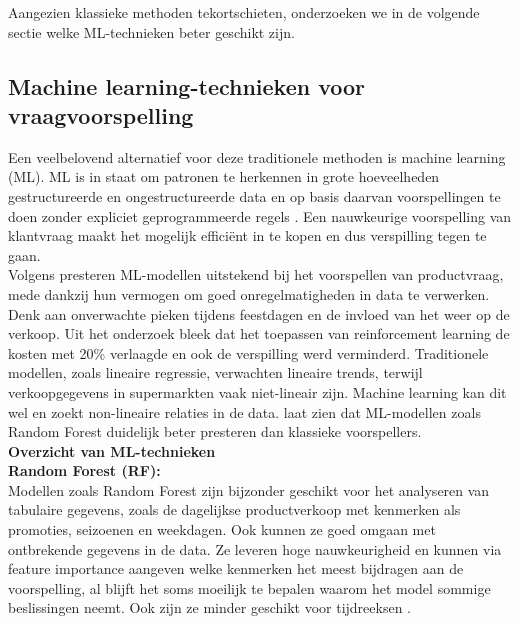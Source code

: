 \documentclass{hogent-article}
\begin{document}
    Aangezien klassieke methoden tekortschieten, onderzoeken we in de volgende sectie welke ML-technieken beter geschikt zijn.
    
    \subsection{Machine learning-technieken voor vraagvoorspelling}
    
    Een veelbelovend alternatief voor deze traditionele methoden is machine learning (ML). ML is in staat om patronen te herkennen in grote hoeveelheden gestructureerde en ongestructureerde data en op basis daarvan voorspellingen te doen zonder expliciet geprogrammeerde regels \autocite{Chopra2016}. Een nauwkeurige voorspelling van klantvraag maakt het mogelijk efficiënt in te kopen en dus verspilling tegen te gaan.\\
    
    Volgens \textcite{Pilarski2024} presteren ML-modellen uitstekend bij het voorspellen van productvraag, mede dankzij hun vermogen om goed onregelmatigheden in data te verwerken. Denk aan onverwachte pieken tijdens feestdagen en de invloed van het weer op de verkoop. Uit het onderzoek bleek dat het toepassen van reinforcement learning de kosten met 20\% verlaagde en ook de verspilling werd verminderd. Traditionele modellen, zoals lineaire regressie, verwachten lineaire trends, terwijl verkoopgegevens in supermarkten vaak niet-lineair zijn. Machine learning kan dit wel en zoekt non-lineaire relaties in de data. \textcite{Liu2021} laat zien dat ML-modellen zoals Random Forest duidelijk beter presteren dan klassieke voorspellers. \\
    
    \textbf{Overzicht van ML-technieken}\\
    
    \textbf{Random Forest (RF):}\\
    
    Modellen zoals Random Forest zijn bijzonder geschikt voor het analyseren van tabulaire gegevens, zoals de dagelijkse productverkoop met kenmerken als promoties, seizoenen en weekdagen. Ook kunnen ze goed omgaan met ontbrekende gegevens in de data. Ze leveren hoge nauwkeurigheid en kunnen via feature importance aangeven welke kenmerken het meest bijdragen aan de voorspelling, al blijft het soms moeilijk te bepalen waarom het model sommige beslissingen neemt. Ook zijn ze minder geschikt voor tijdreeksen \autocite{Zhang2017}.\\
    
\end{document}
